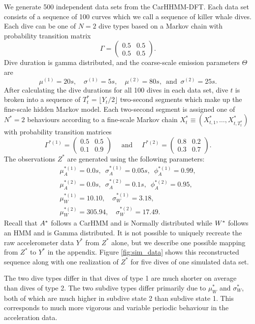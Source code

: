 We generate 500 independent data sets from the CarHHMM-DFT. Each data set consists of a sequence of 100 curves which we call a sequence of killer whale dives. Each dive can be one of $N=2$ dive types based on a Markov chain with probability transition matrix
%
$$\Gamma = \begin{pmatrix} 0.5 & 0.5 \\ 0.5 & 0.5 \end{pmatrix}.$$
%
Dive duration is gamma distributed, and the coarse-scale emission parameters $\Theta$ are
$$
    \mu^{(1)} = 20s, \quad \sigma^{(1)} = 5s, \quad
    \mu^{(2)} = 80s, \enspace \text{and} \enspace \sigma^{(2)} = 25s.
$$
%
After calculating the dive durations for all 100 dives in each data set, dive $t$ is broken into a sequence of $T^*_t = \lfloor Y_t/2 \rfloor$ two-second segments which make up the fine-scale hidden Markov model. Each two-second segment is assigned one of $N^*=2$ behaviours according to a fine-scale Markov chain $X^*_t \equiv \left(X^*_{t,1}, \ldots, X^*_{t,T^*_t} \right)$ with probability transition matrices
%
$$\Gamma^{*(1)} = \begin{pmatrix} 0.5 & 0.5 \\ 0.1 & 0.9 \end{pmatrix} \quad \text{ and } \quad \Gamma^{*(2)} = \begin{pmatrix} 0.8 & 0.2 \\ 0.3 & 0.7 \end{pmatrix}.$$ 
%
The observations $Z^*$ are generated using the following parameters:
%
\begin{gather*}
    \mu_A^{*(1)} = 0.0 s, \enspace \sigma_A^{*(1)} = 0.05s, \enspace \phi_A^{*(1)} = 0.99, \\
    \mu_A^{*(2)} = 0.0 s, \enspace \sigma_A^{*(2)} = 0.1s, \enspace \phi_A^{*(2)} = 0.95, \\
    \mu_W^{*(1)} = 10.10, \quad \sigma_W^{*(1)} = 3.18, \\
    \mu_W^{*(2)} = 305.94, \quad \sigma_W^{*(2)} = 17.49.
\end{gather*}
%
Recall that $A^*$ follows a CarHMM and is Normally distributed while $W^*$ follows an HMM and is Gamma distributed. It is not possible to uniquely recreate the raw accelerometer data $Y^*$ from $Z^*$ alone, but we describe one possible mapping from $Z^*$ to $Y^*$ in the appendix. Figure \ref{fig:sim_data} shows this reconstructed sequence along with one realization of $Z^*$ for five dives of one simulated data set. 

The two dive types differ in that dives of type 1 are much shorter on average than dives of type 2. The two subdive types differ primarily due to $\mu_W^*$ and $\sigma_W^*$, both of which are much higher in subdive state 2 than subdive state 1. This corresponds to much more vigorous and variable periodic behaviour in the acceleration data.

